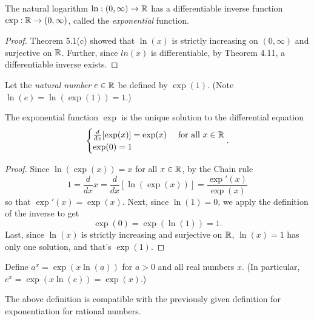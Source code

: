 \documentclass[letterpaper, twoside, 12pt]{book}
\begin{document}
\begin{proposition}[pg. 120]
  The natural logarithm
  \(\ln:(0,\infty)\to\mathbb R\)
  has a differentiable inverse function \(\exp:\mathbb R\to(0,\infty)\),
  called the \textit{exponential} function.
\end{proposition}

\begin{proof}
    Theorem 5.1(c) showed that \(\ln(x)\) is strictly increasing 
    on \((0, \infty)\) and surjective on \(\mathbb R\). Further, since
    \(ln(x)\) is differentiable, by Theorem 4.11, a differentiable
    inverse exists.
\end{proof}

\begin{definition}
  Let the \textit{natural number}
  \(e\in\mathbb R\) be defined by \(\exp(1)\). (Note
  \(\ln(e)=\ln(\exp(1))=1\).)
\end{definition}

\begin{proposition}[pg. 120]
  The exponential function \(\exp\) is the unique solution to the
  differential equation
  \[
    \begin{cases}
      \frac{d}{dx}[\exp(x)]=\exp(x) & \text{ for all } x\in \mathbb R \\
      \exp(0)=1
    \end{cases}
  .\]
\end{proposition}

\begin{proof}
    Since \(\ln(\exp(x)) = x\) for all \(x \in \mathbb R\), 
    by the Chain rule
    \[ 1 = \frac{d}{dx} x = 
        \frac{d}{dx}[ \ln(\exp(x)) ] = \frac{\exp'(x)}{\exp(x)} \]
    so that \(\exp'(x) = \exp(x)\).
    Next, since \(\ln(1) = 0\), we apply the definition of the inverse to get
    \[ \exp(0) = \exp(\ln(1)) = 1 .\]
    Last, since \(\ln(x)\) is strictly increasing and surjective on \(\mathbb R\),
    \(\ln(x) = 1\) has only one solution, and that's \(\exp(1)\).
\end{proof}

\begin{definition}
  Define \(a^x=\exp(x\ln(a))\) for \(a>0\) and all real numbers \(x\).
  (In particular, \(e^x=\exp(x\ln(e))=\exp(x)\).)
\end{definition}

\begin{proposition}[pg. 121]
  The above definition is compatible with the previously given definition
  for exponentiation for rational numbers.
\end{proposition}
\end{document}
